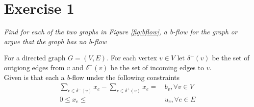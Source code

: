 \section{Exercise 1}
\textit{Find for each of the two graphs in Figure \ref{fig:bflow}, a b-flow for the graph or argue that the graph has no b-flow}

For a directed graph \(G=(V,E)\). For each vertex \(v \in V\) let \(\delta^+(v)\) be the set of outgiong edges from \(v\) and \(\delta^-(v)\) be the set of incoming edges to \(v\).\\
Given is that each a \textit{b}-flow under the following constraints
\begin{align}
\sum_{e\in \delta^-(v)} x_e - \sum_{e\in \delta^+(v)} x_e =&\, b_v, \forall v \in V\\
0 \leq x_e \leq&\, u_e, \forall e \in E
\end{align}
